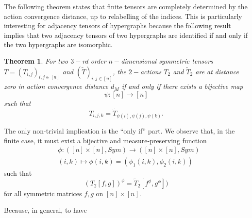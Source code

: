 \documentclass[11pt]{article}
\newtheorem{theorem}{Theorem}[section]
\begin{document}
The following theorem states that finite tensors are completely determined by the action convergence distance, up to relabelling of the indices. This is particularly interesting for adjacency tensors of hypergraphs because the following result implies that two adjacency tensors of two hypergraphs are identified if and only if the two hypergraphs are isomorphic.    

\begin{theorem}\label{IdentificationTensors}
For two $3-$rd order $n-$dimensional symmetric tensors $T=(T_{i,j})_{i,j\in [n]}$ and $(\widetilde{T})_{i,j\in [n]}$, the $2-$actions $T_2$ and $\widetilde{T}_2$ are at distance zero in action convergence distance $d_M$ if and only if there exists a bijective map $$\psi:[n]\rightarrow [n]$$
  such that 
   $$T_{i,j,k}=\widetilde{T}_{\psi(i),\psi(j),\psi(k)}.$$  \end{theorem}
\proof
The only non-trivial implication is the “only if” part.
We observe that, in the finite case, it must exist a bijective and measure-preserving function
$$\begin{aligned}
&\phi: ([n]\times [n],Sym)\longrightarrow ([n]\times [n],Sym)
\\ & (i,k)\mapsto\phi(i,k)=(\phi_1(i,k),\phi_2(i,k))
\end{aligned}$$
such that 
$$
(T_2[f,g])^{\phi}=\widetilde{T}_2[f^{\phi},g^{\phi}])
$$
for all symmetric matrices $f,g$ on $[n]\times[n]$. 

Because, in general, to have 
\end{document}
